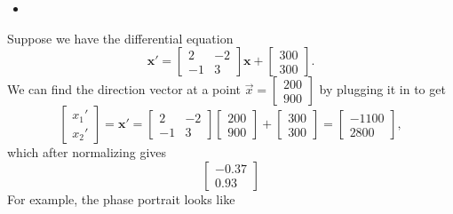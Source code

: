 \begin{itemize}
\begin{itemize}
              \item
          \end{itemize}
          \begin{example}
              Suppose we have the differential equation
              \begin{equation}
                  \bm{x}'= \begin{bmatrix}
                      2 & -2 \\ -1&3
                  \end{bmatrix}\bm{x} + \begin{bmatrix}
                      300 \\ 300
                  \end{bmatrix}.
              \end{equation}
              We can find the direction vector at a point $\vec{x}=\begin{bmatrix}
                      200 \\ 900
                  \end{bmatrix}$ by plugging it in to get
              \begin{equation}
                  \begin{bmatrix}
                      x_1' \\ x_2'
                  \end{bmatrix} = \bm{x}' = \begin{bmatrix}
                      2 & - 2 \\ -1 & 3
                  \end{bmatrix}\begin{bmatrix}
                      200 \\ 900
                  \end{bmatrix} + \begin{bmatrix}
                      300 \\ 300
                  \end{bmatrix} = \begin{bmatrix}
                      -1100 \\ 2800
                  \end{bmatrix},
              \end{equation}
              which after normalizing gives
              \begin{equation}
                  \begin{bmatrix}
                      -0.37 \\ 0.93
                  \end{bmatrix}
              \end{equation}
              For example, the phase portrait looks like
              \begin{center}
                \def\length{sqrt((2*x-2*y+300)^2+(-1*x+3*y+300)^2)}


\end{center}
\end{example}
\end{itemize}
